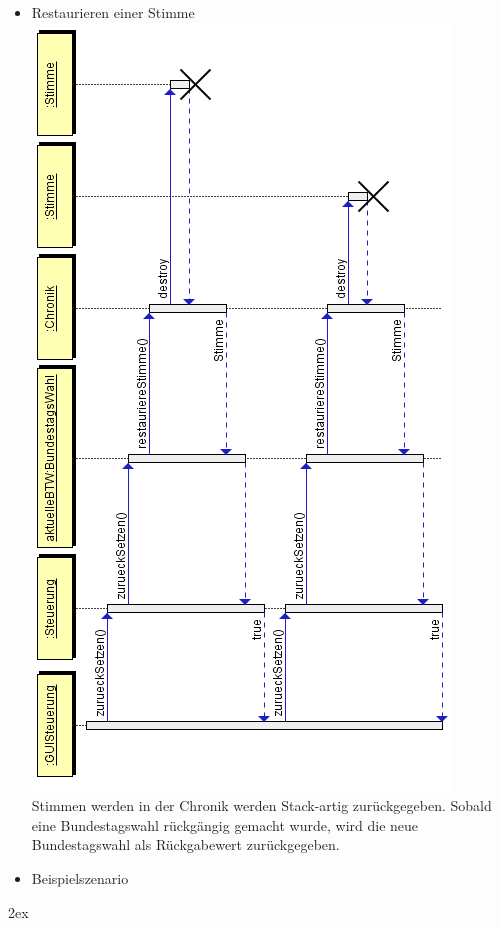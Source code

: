 \documentclass[12pt,a4paper,titlepage]{article}
\begin{document}
\begin{itemize}
	\item Restaurieren einer Stimme \\
		\includegraphics[scale=0.7]{Chronik_Sequenzdiagramm-restaurieren.png}
		\\
		Stimmen werden in der Chronik werden Stack-artig zurückgegeben. Sobald eine Bundestagswahl rückgängig gemacht wurde, wird die neue Bundestagswahl als Rückgabewert zurückgegeben.
	\item Beispielszenario	
\end{itemize}

\begingroup
\parindent 0pt
\parskip 2ex
\def\enotesize{\normalsize}

\endgroup
\end{document}
